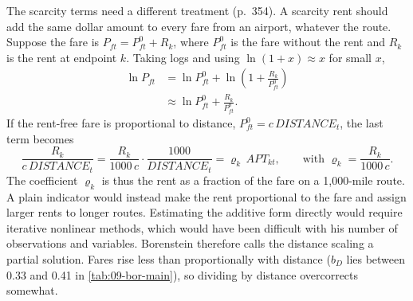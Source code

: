 The scarcity terms need a different treatment (p.~354). A scarcity rent should add the same dollar amount to
every fare from an airport, whatever the route. Suppose the fare is $P_{ft} = P^0_{ft} + R_k$, where $P^0_{ft}$
is the fare without the rent and $R_k$ is the rent at endpoint $k$. Taking logs and using
$\ln(1 + x) \approx x$ for small $x$,
\begin{align*}
\ln P_{ft} &= \ln P^0_{ft} + \ln\left(1 + \frac{R_k}{P^0_{ft}}\right) \\
&\approx \ln P^0_{ft} + \frac{R_k}{P^0_{ft}} .
\end{align*}
If the rent-free fare is proportional to distance, $P^0_{ft} = c\, \mathit{DISTANCE}_t$, the last term becomes
\begin{equation*}
\frac{R_k}{c\, \mathit{DISTANCE}_t} = \frac{R_k}{1000\, c} \cdot \frac{1000}{\mathit{DISTANCE}_t}
= \varrho_k\, \mathit{APT}_{kt}, \qquad \text{with } \varrho_k = \frac{R_k}{1000\, c} .
\end{equation*}
The coefficient $\varrho_k$ is thus the rent as a fraction of the fare on a 1,000-mile route. A plain indicator
would instead make the rent proportional to the fare and assign larger rents to longer routes. Estimating the
additive form directly would require iterative nonlinear methods, which would have been difficult with his
number of observations and variables. Borenstein therefore calls the distance scaling a partial solution. Fares
rise less than proportionally with distance ($b_D$ lies between 0.33 and 0.41 in \cref{tab:09-bor-main}), so
dividing by distance overcorrects somewhat.

